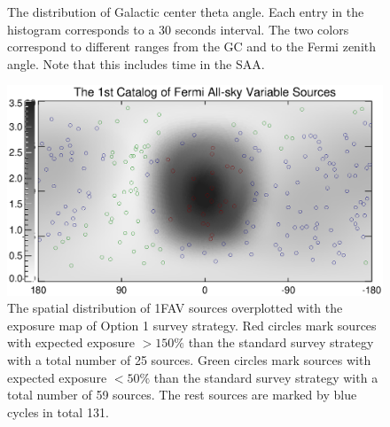 \documentclass[aps,prd,superscriptaddress,showpacs,nofootinbib,fixlfloat, 12pt]{revtex4-1}
\begin{document}
\begin{figure}[t]
\begin{center}
    \vspace{-0.5cm}
  \end{center}
  \caption{The distribution of Galactic center theta angle. Each entry in the
  histogram corresponds to a 30 seconds interval. The two colors correspond to
  different ranges from the GC and to the Fermi zenith angle.
  Note that this includes time in the SAA.} %
  \label{fig:thetaDist}
\end{figure}

\begin{figure}[t]
  \begin{center}
    \includegraphics[width=0.9\linewidth, angle=0]{plots/transient_source_map.ps}
    \vspace{-0.5cm}
  \end{center}
  \caption{The spatial distribution of 1FAV sources overplotted with the exposure map of Option 1 survey strategy. Red circles mark sources with expected exposure $>150\%$ than the standard survey strategy with a total number of 25 sources. Green circles mark sources with expected exposure $<50\%$ than the standard survey strategy with a total number of 59 sources. The rest sources are marked by blue cycles in total 131. }
  \label{fig:transmap}
\end{figure}
\end{document}
